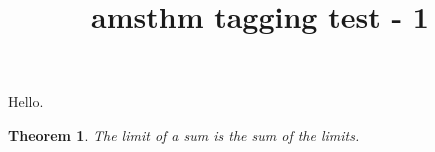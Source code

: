 \documentclass{article}
\title{amsthm tagging test - 1}
\newtheorem{thrm}{Theorem}
\begin{document}
Hello.

\begin{thrm}
The limit of a sum is the sum of the limits.
\end{thrm}
\end{document}
